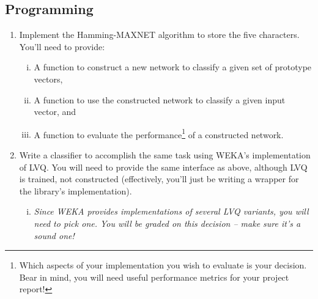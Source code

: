 \documentclass[11pt]{cselabheader}
\begin{document}
\subsection{Programming}
\begin{enumerate}
  \item Implement the Hamming-MAXNET algorithm to store the five characters. You'll need to provide:
  \begin{enumerate}[i.]
    \item A function to construct a new network to classify a given set of prototype vectors,
    \item A function to use the constructed network to classify a given input vector, and
    \item A function to evaluate the performance\footnote{Which aspects of your implementation you wish to evaluate is your decision. Bear in mind, you will need useful performance metrics for your project report!} of a constructed network.
  \end{enumerate}

  \item Write a classifier to accomplish the same task using WEKA's implementation of LVQ. You will need to provide the same interface as above, although LVQ is trained, not constructed (effectively, you'll just be writing a wrapper for the library's implementation).
  \begin{enumerate}[i.]
    \item \textit{Since WEKA provides implementations of several LVQ variants, you will need to pick one. You will be graded on this decision -- make sure it's a sound one!}
  \end{enumerate}
\end{enumerate}
\end{document}
